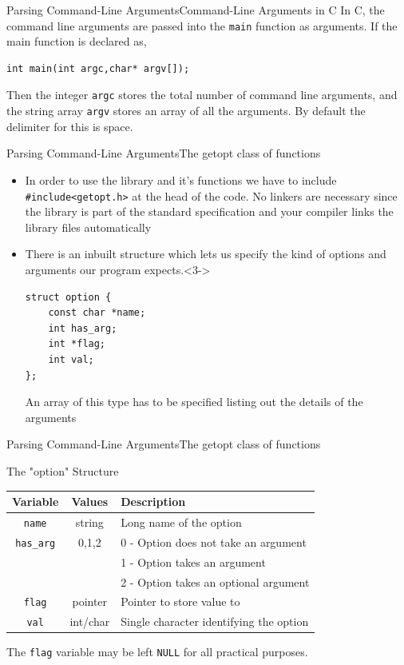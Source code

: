 \documentclass{beamer}
\begin{document}
\begin{frame}[fragile]{Parsing Command-Line Arguments}{Command-Line Arguments in C}
In C, the command line arguments are passed into the \verb|main| function as arguments. If the main function is declared as,
\begin{verbatim}
int main(int argc,char* argv[]);
\end{verbatim}
Then the integer \verb|argc| stores the total number of command line arguments, and the string array \verb|argv| stores an array of all the arguments. By default the delimiter for this is space.
\end{frame}

\begin{frame}[fragile]{Parsing Command-Line Arguments}{The getopt class of functions}
\begin{itemize}
\item<1-> In order to use the library and it's functions we have to include \verb|#include<getopt.h>| at the head of the code. No linkers are necessary since the library is part of the standard specification and your compiler links the library files automatically
\item<2-> There is an inbuilt structure which lets us specify the kind of options and arguments our program expects.<3-> 
\begin{verbatim}
struct option {
    const char *name;
    int has_arg;
    int *flag;
    int val;
};
\end{verbatim}
An array of this type has to be specified listing out the details of the arguments
\end{itemize}
\end{frame}

\begin{frame}[fragile]{Parsing Command-Line Arguments}{The getopt class of functions}
\begin{block}{The "option" Structure}
\begin{tabular}{ccl}
\hline\hline
Variable&Values&Description\\
\hline
\verb|name|&string&Long name of the option\\
\verb|has_arg|&0,1,2&0 - Option does not take an argument\\
&&1 - Option takes an argument\\
&&2 - Option takes an optional argument\\
\verb|flag|&pointer&Pointer to store value to\\
\verb|val|&int/char&Single character identifying the option\\
\hline\hline
\end{tabular}
The \verb|flag| variable may be left \verb|NULL| for all practical purposes.
\end{block}
\end{frame}
\end{document}
